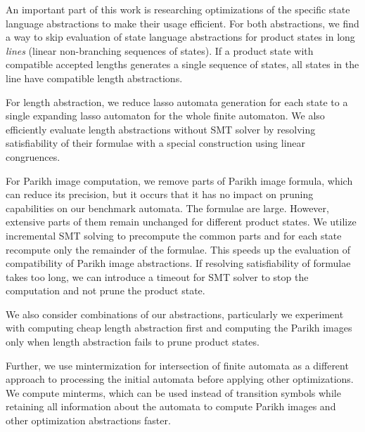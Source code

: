 
An important part of this work is researching optimizations of the specific state language abstractions to make their usage efficient. For both abstractions, we find a way to skip evaluation of state language abstractions for product states in long \emph{lines} (linear non-branching sequences of states). If a product state with compatible accepted lengths generates a single sequence of states, all states in the line have compatible length abstractions.

For length abstraction, we reduce lasso automata generation for each state to a single expanding lasso automaton for the whole finite automaton. We also efficiently evaluate length abstractions without SMT solver by resolving satisfiability of their formulae with a special construction using linear congruences.

For Parikh image computation, we remove parts of Parikh image formula, which can reduce its precision, but it occurs that it has no impact on pruning capabilities on our benchmark automata. The formulae are large. However, extensive parts of them remain unchanged for different product states. We utilize incremental SMT solving to precompute the common parts and for each state recompute only the remainder of the formulae. This speeds up the evaluation of compatibility of Parikh image abstractions. If resolving satisfiability of formulae takes too long, we can introduce a timeout for SMT solver to stop the computation and not prune the product state.

We also consider combinations of our abstractions, particularly we experiment with computing cheap length abstraction first and computing the Parikh images only when length abstraction fails to prune product states.


Further, we use mintermization for intersection of finite automata as a different approach to processing the initial automata before applying other optimizations. We compute minterms, which can be used instead of transition symbols while retaining all information about the automata to compute Parikh images and other optimization abstractions faster.


